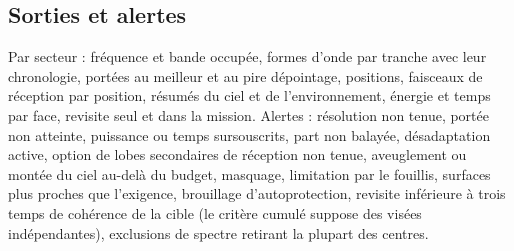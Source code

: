 \documentclass[11pt,a4paper]{article}
\begin{document}
\subsection{Sorties et alertes}
Par secteur : fréquence et bande occupée, formes d'onde par tranche avec leur chronologie, portées au meilleur et au
pire dépointage, positions, faisceaux de réception par position, résumés du ciel et de l'environnement, énergie et
temps par face, revisite seul et dans la mission. Alertes : résolution non tenue, portée non atteinte, puissance ou
temps sursouscrits, part non balayée, désadaptation active, option de lobes secondaires de réception non tenue,
aveuglement ou montée du ciel au-delà du budget, masquage, limitation par le fouillis, surfaces plus proches que
l'exigence, brouillage d'autoprotection, revisite inférieure à trois temps de cohérence de la cible (le critère cumulé
suppose des visées indépendantes), exclusions de spectre retirant la plupart des centres.

\end{document}

